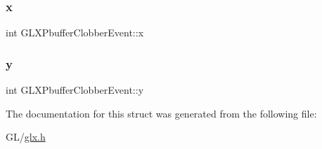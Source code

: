 \subsubsection{\texorpdfstring{x}{x}}
{\footnotesize\ttfamily int G\+L\+X\+Pbuffer\+Clobber\+Event\+::x}

\mbox{\label{struct_g_l_x_pbuffer_clobber_event_a69eb7ac60d36ac3ec4550ac206cfc61f}} 
\subsubsection{\texorpdfstring{y}{y}}
{\footnotesize\ttfamily int G\+L\+X\+Pbuffer\+Clobber\+Event\+::y}



The documentation for this struct was generated from the following file\+:\begin{DoxyCompactItemize}
\item 
G\+L/\hyperlink{glx_8h}{glx.\+h}\end{DoxyCompactItemize}
